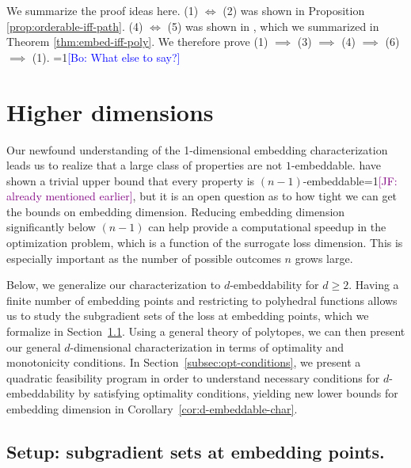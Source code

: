 \documentclass[anon]{colt2020} %
\newcommand{\Comments}{1}
\newcommand{\mynote}[2]{\ifnum\Comments=1\textcolor{#1}{#2}\fi}
\newcommand{\jessie}[1]{\mynote{purple}{[JF: #1]}}
\newcommand{\bo}[1]{\mynote{blue}{[Bo: #1]}}
\newcommand{\reals}{\mathbb{R}}
\newcommand{\R}{\mathcal{R}}
\newcommand{\Y}{\mathcal{Y}}
\newcommand{\inprod}[2]{\langle #1, #2 \rangle}%
\begin{document}
We summarize the proof ideas here.
(1) $\iff$ (2) was shown in Proposition \ref{prop:orderable-iff-path}.
(4) $\iff$ (5) was shown in \cite{finocchiaro2019embedding}, which we summarized in Theorem \ref{thm:embed-iff-poly}.
We therefore prove (1) $\implies$ (3) $\implies$ (4) $\implies$ (6) $\implies$ (1).
\bo{What else to say?}


\section{Higher dimensions}\label{sec:d-dim}
Our newfound understanding of the 1-dimensional embedding characterization leads us to realize that a large class of properties are not $1$-embeddable.
\cite{finocchiaro2019embedding} have shown a trivial upper bound that every property is $(n-1)$-embeddable\jessie{already mentioned earlier}, but it is an open question as to how tight we can get the bounds on embedding dimension.
Reducing embedding dimension significantly below $(n-1)$ can help provide a computational speedup in the optimization problem, which is a function of the surrogate loss dimension.
This is especially important as the number of possible outcomes $n$ grows large.

Below, we generalize our characterization to $d$-embeddability for $d \geq 2$.
Having a finite number of embedding points and restricting to polyhedral functions allows us to study the subgradient sets of the loss at embedding points, which we formalize in Section~\ref{subsec:sub-sets}.
Using a general theory of polytopes, we can then present our general $d$-dimensional characterization in terms of optimality and monotonicity conditions.
In Section~\ref{subsec:opt-conditions}, we present a quadratic feasibility program in order to understand necessary conditions for $d$-embeddability by satisfying optimality conditions, yielding new lower bounds for embedding dimension in Corollary~\ref{cor:d-embeddable-char}.

\subsection{Setup: subgradient sets at embedding points.}\label{subsec:sub-sets}
\end{document}
